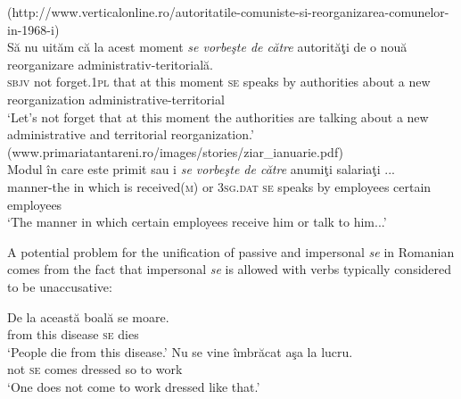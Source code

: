 \documentclass[output=paper]{langsci/langscibook}
\begin{document}
\ea \label{ex:giurgea:10}
    \ea (http://www.verticalonline.ro/autoritatile-comuniste-si-reorganizarea-comunelor-in-1968-i)\\
    \gll  Să    nu  uităm        că    la acest moment \emph{se vorbeşte de către}  autorităţi de    o nouă reorganizare administrativ-teritorială.\\
    {\textsc{sbjv} }{not forget.1}{\textsc{pl}}{ that at this   moment} {\textsc{se}}{ speaks   by          authorities about a} new  reorganization administrative-territorial\\
    \glt ‘Let’s not forget that at this moment the authorities are talking about a new administrative and territorial reorganization.’
    \ex (www.primariatantareni.ro/images/stories/ziar\_ianuarie.pdf)\\
    \gll Modul        în care    este primit          sau i \emph{se vorbeşte de  către} anumiţi salariaţi ...\\
         manner-the in which is   received(\textsc{m})  or  \textsc{3sg}.\textsc{dat se} speaks    by employees certain  employees\\
    \glt ‘The manner in which certain employees receive him or talk to him...’
    \z
\z

A potential problem for the unification of passive and impersonal \textit{se} in Romanian comes from the fact that impersonal \textit{se} is allowed with verbs typically considered to be unaccusative:

\ea%
    \label{ex:giurgea:11}
    \ea
    \gll De la această boală    se  moare.\\
         from  this       disease \textsc{se} dies\\
    \glt ‘People die from this disease.’
    \ex
    \gll Nu se vine     îmbrăcat aşa la lucru.\\
         not \textsc{se} comes dressed  so   to work\\
    \glt ‘One does not come to work dressed like that.’
    \z
\z    
 
\end{document}
